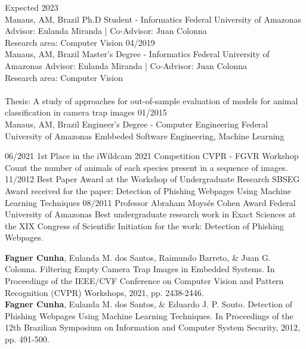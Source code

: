 \documentclass[10pt]{developercv} %
\begin{document}
\begin{entrylist}
  \entry
  {Expected 2023\\\footnotesize{Manaus, AM, Brazil}}
  {Ph.D Student - Informatics}
  {Federal University of Amazonas}
  {Advisor: Eulanda Miranda | Co-Advisor: Juan Colonna\\
  Research area: Computer Vision}
  \entry
  {04/2019\\\footnotesize{Manaus, AM, Brazil}}
  {Master's Degree - Informatics}
  {Federal University of Amazonas}
  {Advisor: Eulanda Miranda | Co-Advisor: Juan Colonna\\
  Research area: Computer Vision\\\\
 Thesis: A study of approaches for out-of-sample evaluation of models for 
animal classification in camera trap images}
  \entry
  {01/2015\\\footnotesize{Manaus, AM, Brazil}}
  {Engineer's Degree - Computer Engineering}
  {Federal University of Amazonas}
  {Embbeded Software Engineering, Machine Learning}
\end{entrylist}



\begin{entrylist}
  \entry
  {06/2021}
  {1st Place in the iWildcam 2021 Competition}
  {CVPR - FGVR Workshop}
  {Count the number of animals of each species present in a sequence of images.}
  \entry
  {11/2012}
  {Best Paper Award at the Workshop of Undergraduate Research}
  {SBSEG}
  {Award received for the paper: Detection 
of Phishing Webpages Using Machine Learning Techniques}
  \entry
  {08/2011}
  {Professor Abraham Moysés Cohen Award}
  {Federal University of Amazonas}
  {Best undergraduate research work in Exact Sciences at the XIX Congress of 
Scientific Initiation for the work: Detection of Phishing Webpages.}
\end{entrylist}



\begin{minipage}[t]{\textwidth}

\textbf{Fagner Cunha}, Eulanda M. dos Santos, Raimundo Barreto, \& Juan G. 
Colonna. Filtering Empty Camera Trap Images in Embedded Systems. In Proceedings 
of the IEEE/CVF Conference on Computer Vision and Pattern 
Recognition (CVPR) Workshops, 2021, pp. 2438-2446.\\

\textbf{Fagner Cunha}, Eulanda M. dos Santos, \& Eduardo J. P. Souto. Detection 
of Phishing Webpages Using Machine Learning Techniques. In Proceedings 
of the 12th Brazilian Symposium on Information and Computer System Security, 
2012, pp. 491-500.
\end{minipage}
\end{document}
